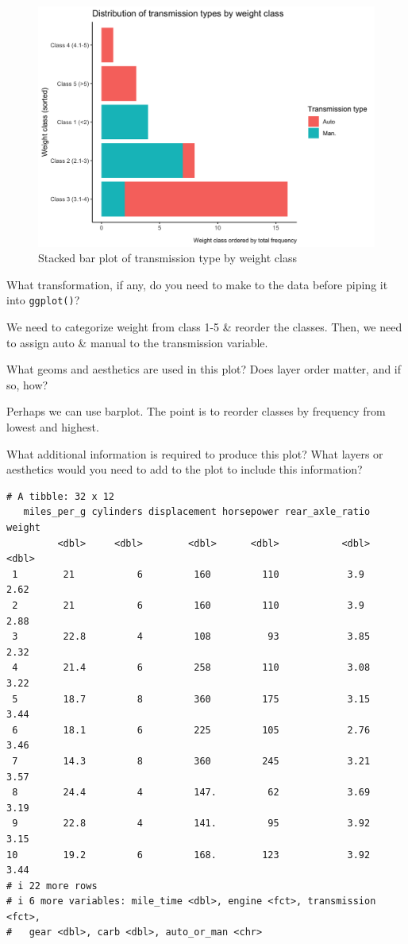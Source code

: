 \documentclass[
  man,
  floatsintext,
  longtable,
  nolmodern,
  notxfonts,
  notimes,
  colorlinks=true,linkcolor=blue,citecolor=blue,urlcolor=blue]{apa7}
\begin{document}
\begin{figure}[H]

\caption{Stacked bar plot of transmission type by weight class}

{\centering \includegraphics{plots/plot6.png}

}

\end{figure}%

What transformation, if any, do you need to make to the data before
piping it into \texttt{ggplot()}?

We need to categorize weight from class 1-5 \& reorder the classes.
Then, we need to assign auto \& manual to the transmission variable.

What geoms and aesthetics are used in this plot? Does layer order
matter, and if so, how?

Perhaps we can use barplot. The point is to reorder classes by frequency
from lowest and highest.

What additional information is required to produce this plot? What
layers or aesthetics would you need to add to the plot to include this
information?

\begin{verbatim}
# A tibble: 32 x 12
   miles_per_g cylinders displacement horsepower rear_axle_ratio weight
         <dbl>     <dbl>        <dbl>      <dbl>           <dbl>  <dbl>
 1        21           6         160         110            3.9    2.62
 2        21           6         160         110            3.9    2.88
 3        22.8         4         108          93            3.85   2.32
 4        21.4         6         258         110            3.08   3.22
 5        18.7         8         360         175            3.15   3.44
 6        18.1         6         225         105            2.76   3.46
 7        14.3         8         360         245            3.21   3.57
 8        24.4         4         147.         62            3.69   3.19
 9        22.8         4         141.         95            3.92   3.15
10        19.2         6         168.        123            3.92   3.44
# i 22 more rows
# i 6 more variables: mile_time <dbl>, engine <fct>, transmission <fct>,
#   gear <dbl>, carb <dbl>, auto_or_man <chr>
\end{verbatim}
\end{document}

